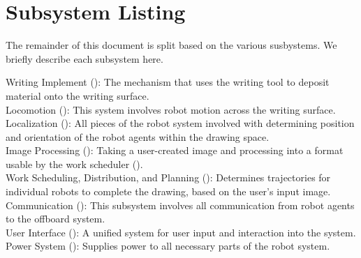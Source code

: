 
\section{Subsystem Listing}
\label{sec:subsystem_listing}

The remainder of this document is split based on the various susbystems. We briefly describe each subsystem here.

Writing Implement (): The mechanism that uses the writing tool to deposit material onto the writing surface. \\
Locomotion (): This system involves robot motion across the writing surface. \\
Localization (): All pieces of the robot system involved with determining position and orientation of the robot agents within the drawing space. \\
Image Processing (): Taking a user-created image and processing into a format usable by the work scheduler (). \\
Work Scheduling, Distribution, and Planning (): Determines trajectories for individual robots to complete the drawing, based on the user's input image. \\
Communication (): This subsystem involves all communication from robot agents to the offboard system. \\
User Interface (): A unified system for user input and interaction into the system. \\
Power System (): Supplies power to all necessary parts of the robot system.
